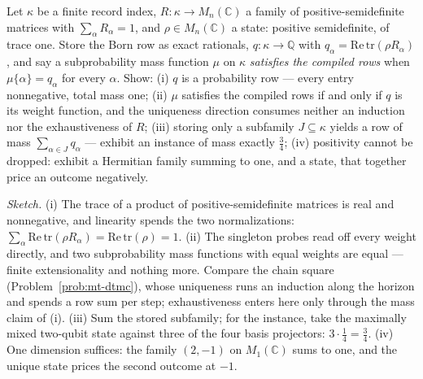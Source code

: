 \begin{problem}
\label{prob:mt-qnet}
Let $\kappa$ be a finite record index, $R \colon \kappa \to
M_n(\mathbb{C})$ a family of positive-semidefinite matrices with
$\sum_\alpha R_\alpha = 1$, and $\rho \in M_n(\mathbb{C})$ a state:
positive semidefinite, of trace one. Store the Born row as exact
rationals, $q \colon \kappa \to \mathbb{Q}$ with $q_\alpha =
\mathrm{Re}\,\mathrm{tr}(\rho R_\alpha)$, and say a subprobability
mass function $\mu$ on $\kappa$ \emph{satisfies the compiled rows}
when $\mu\{\alpha\} = q_\alpha$ for every $\alpha$. Show: (i) $q$ is
a probability row --- every entry nonnegative, total mass one; (ii)
$\mu$ satisfies the compiled rows if and only if $q$ is its weight
function, and the uniqueness direction consumes neither an induction
nor the exhaustiveness of $R$; (iii) storing only a subfamily $J
\subseteq \kappa$ yields a row of mass $\sum_{\alpha \in J}
q_\alpha$ --- exhibit an instance of mass exactly $\tfrac34$; (iv)
positivity cannot be dropped: exhibit a Hermitian family summing to
one, and a state, that together price an outcome negatively.
\end{problem}

\emph{Sketch.} (i) The trace of a product of positive-semidefinite
matrices is real and nonnegative, and linearity spends the two
normalizations: $\sum_\alpha \mathrm{Re}\,\mathrm{tr}(\rho R_\alpha)
= \mathrm{Re}\,\mathrm{tr}(\rho) = 1$. (ii) The singleton probes
read off every weight directly, and two subprobability mass
functions with equal weights are equal --- finite extensionality and
nothing more. Compare the chain square (Problem~\ref{prob:mt-dtmc}),
whose uniqueness runs an induction along the horizon and spends a
row sum per step; exhaustiveness enters here only through the mass
claim of (i). (iii) Sum the stored subfamily; for the instance, take
the maximally mixed two-qubit state against three of the four basis
projectors: $3 \cdot \tfrac14 = \tfrac34$. (iv) One dimension
suffices: the family $(2, -1)$ on $M_1(\mathbb{C})$ sums to one, and
the unique state prices the second outcome at $-1$.

